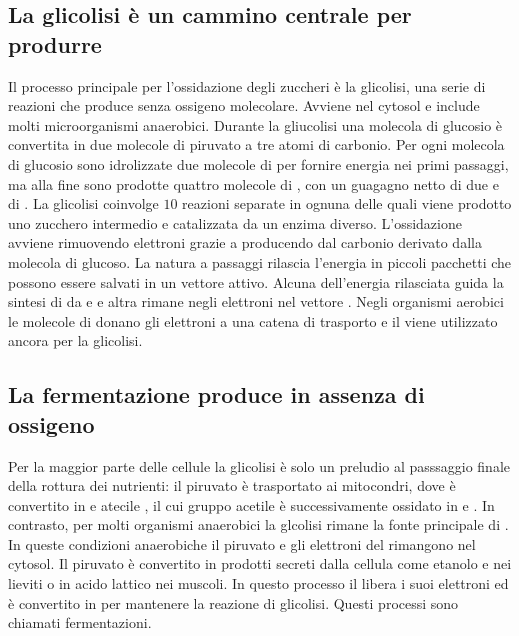 \subsection{La glicolisi \`e un cammino centrale per produrre }
Il processo principale per l'ossidazione degli zuccheri \`e la glicolisi, una serie di reazioni che produce  senza ossigeno molecolare. Avviene nel cytosol e include molti 
microorganismi anaerobici. Durante la gliucolisi una molecola di glucosio \`e convertita in due molecole di piruvato a tre atomi di carbonio. Per ogni molecola di glucosio sono 
idrolizzate due molecole di  per fornire energia nei primi passaggi, ma alla fine sono prodotte quattro molecole di , con un guagagno netto di due  e di 
. La glicolisi coinvolge $10$ reazioni separate in ognuna delle quali viene prodotto uno zucchero intermedio e catalizzata da un enzima diverso. L'ossidazione avviene 
rimuovendo elettroni grazie a  producendo  dal carbonio derivato dalla molecola di glucoso. La natura a passaggi rilascia l'energia in piccoli pacchetti che possono 
essere salvati in un vettore attivo. Alcuna dell'energia rilasciata guida la sintesi di  da  e  e altra rimane negli elettroni nel vettore . Negli 
organismi aerobici le molecole di  donano gli elettroni a una catena di trasporto e il  viene utilizzato ancora per la glicolisi. 
\subsection{La fermentazione produce  in assenza di ossigeno}
Per la maggior parte delle cellule la glicolisi \`e solo un preludio al passsaggio finale della rottura dei nutrienti: il piruvato \`e trasportato ai mitocondri, dove \`e convertito in 
 e atecile , il cui gruppo acetile \`e successivamente ossidato in  e . In contrasto, per molti organismi anaerobici la glcolisi rimane la fonte 
principale di . In queste condizioni anaerobiche il piruvato e gli elettroni del  rimangono nel cytosol. Il piruvato \`e convertito in prodotti secreti dalla cellula 
come etanolo e  nei lieviti o in acido lattico nei muscoli. In questo processo il  libera i suoi elettroni ed \`e convertito in  per mantenere la reazione di
glicolisi. Questi processi sono chiamati fermentazioni. 
